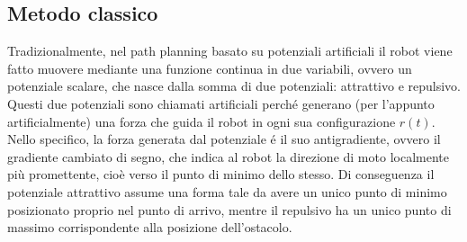 \documentclass[14pt,twoside,a4paper]{extarticle}
\begin{document}
\subsection{Metodo classico}
Tradizionalmente, nel path planning basato su potenziali artificiali il robot viene fatto muovere mediante una funzione continua in due variabili, ovvero un potenziale scalare, che nasce dalla somma di due potenziali: attrattivo e repulsivo. Questi due potenziali sono chiamati artificiali perché generano (per l'appunto artificialmente) una forza che guida il robot in ogni sua configurazione \( r(t)\). Nello specifico, la forza generata dal potenziale é il suo antigradiente, ovvero il gradiente cambiato di segno, che indica al robot la direzione di moto localmente più promettente\cite{oriolo}, cioè verso il punto di minimo dello stesso. Di conseguenza il potenziale attrattivo assume una forma tale da avere un unico punto di minimo posizionato proprio nel punto di arrivo, mentre il repulsivo ha un unico punto di massimo corrispondente alla posizione dell'ostacolo. 
\end{document}
